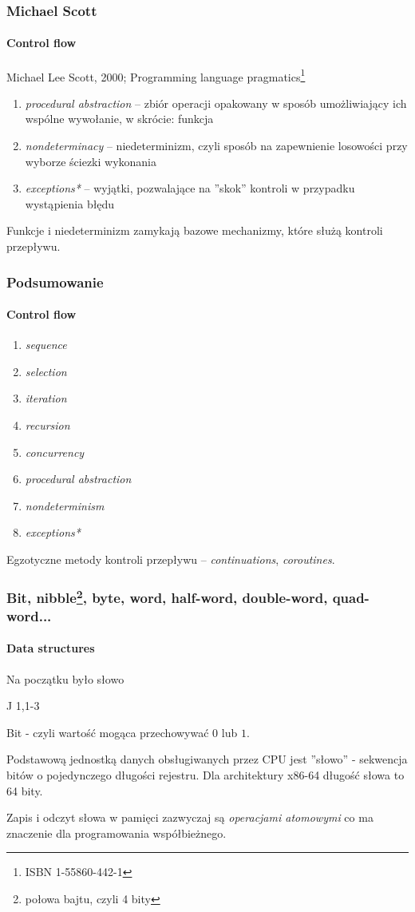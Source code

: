 \documentclass[aspectratio=169]{beamer}
\begin{document}
\begin{frame}
    \frametitle{Michael Scott}
    \framesubtitle{Control flow}

    Michael Lee Scott, 2000; Programming language pragmatics\footnote{ISBN
    1-55860-442-1}

    \vspace{1em}

    \begin{enumerate}
        \item \emph{procedural abstraction} -- zbiór operacji opakowany w sposób
            umożliwiający ich wspólne wywołanie, w skrócie: funkcja
        \item \emph{nondeterminacy} -- niedeterminizm, czyli sposób na
            zapewnienie losowości przy wyborze ściezki wykonania
        \item \emph{exceptions*} -- wyjątki, pozwalające na ''skok'' kontroli w
            przypadku wystąpienia błędu
    \end{enumerate}

    \vspace{1em}

    Funkcje i niedeterminizm zamykają bazowe mechanizmy, które służą kontroli
    przepływu.
\end{frame}

\begin{frame}
    \frametitle{Podsumowanie}
    \framesubtitle{Control flow}

    \begin{enumerate}
        \item \emph{sequence}
        \item \emph{selection}
        \item \emph{iteration}
        \item \emph{recursion}
        \item \emph{concurrency}
        \item \emph{procedural abstraction}
        \item \emph{nondeterminism}
        \item \emph{exceptions*}
    \end{enumerate}

    Egzotyczne metody kontroli przepływu -- \emph{continuations},
    \emph{coroutines}.
\end{frame}

\begin{frame}
    \frametitle{Bit, nibble\footnote{połowa bajtu, czyli 4 bity}, byte, word,
        half-word, double-word, quad-word...}
    \framesubtitle{Data structures}

    \epigraph{Na początku było słowo}{J 1,1-3}

    Bit - czyli wartość mogąca przechowywać $0$ lub $1$.

    Podstawową jednostką danych obsługiwanych przez CPU jest ''słowo'' -
    sekwencja bitów o pojedynczego długości rejestru. Dla architektury x86-64
    długość słowa to 64 bity.

    Zapis i odczyt słowa w pamięci zazwyczaj są \emph{operacjami atomowymi} co
    ma znaczenie dla programowania współbieżnego.
\end{frame}
\end{document}
